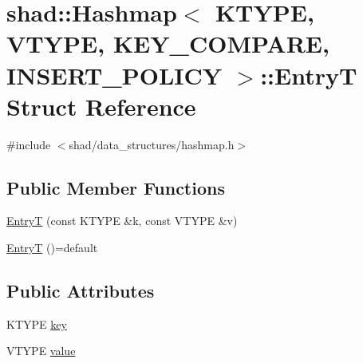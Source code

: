 \hypertarget{structshad_1_1Hashmap_1_1EntryT}{\section{shad\-:\-:Hashmap$<$ K\-T\-Y\-P\-E, V\-T\-Y\-P\-E, K\-E\-Y\-\_\-\-C\-O\-M\-P\-A\-R\-E, I\-N\-S\-E\-R\-T\-\_\-\-P\-O\-L\-I\-C\-Y $>$\-:\-:Entry\-T Struct Reference}
\label{structshad_1_1Hashmap_1_1EntryT}
}


{\ttfamily \#include $<$shad/data\-\_\-structures/hashmap.\-h$>$}

\subsection*{Public Member Functions}
\begin{DoxyCompactItemize}
\item 
\hyperlink{structshad_1_1Hashmap_1_1EntryT_a39276c053bf08a47f7caae5fa0bcac59}{Entry\-T} (const K\-T\-Y\-P\-E \&k, const V\-T\-Y\-P\-E \&v)
\item 
\hyperlink{structshad_1_1Hashmap_1_1EntryT_a7bef504f705c7e0be320b5806f91972c}{Entry\-T} ()=default
\end{DoxyCompactItemize}
\subsection*{Public Attributes}
\begin{DoxyCompactItemize}
\item 
K\-T\-Y\-P\-E \hyperlink{structshad_1_1Hashmap_1_1EntryT_a645bc59daa16e8d0780489e5fbaa3b64}{key}
\item 
V\-T\-Y\-P\-E \hyperlink{structshad_1_1Hashmap_1_1EntryT_ab7cd1b889d5ce8f620b6457c19995c75}{value}
\end{DoxyCompactItemize}


